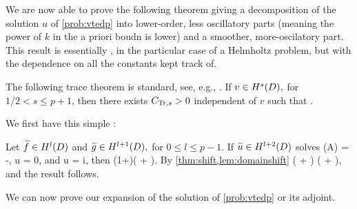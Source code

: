 We are now able to prove the following theorem giving a decomposition of the solution $u$ of \cref{prob:vtedp} into lower-order, less oscillatory parts (meaning the power of $k$ in the a priori boudn is lower) and a smoother, more-oscilatory part. This result is essentially \cite[Theorem 1]{ChNi:18a}, in the particular case of a Helmholtz problem, but with the dependence on all the constants kept track of.

The following trace theorem is standard, see, e.g., \cite[Theorem 3.37]{Mc:00}.
\label{thm:trace}
If $v \in \HsD,$ for $1/2 < s \leq p+1$, then there exists $C_{\mathrm{Tr},s} > 0$ independent of $v$ such that
\beqs
{} \leq \CTrs {}.
\eeqs
\enth

We first have this simple :

\ble\label{lem:domainshift}
Let $\ftilde \in \HlD$ and $\gtilde \in \HlpoD,$ for $0 \leq l \leq p-1$. If $\utilde \in \HlptD$ solves
\beqs
\grad \cdot \mleft(A\grad \utilde\mright) = -\ftilde,
\eeqs
\beqs \trGD u = 0,
\eeqs
and
\beqs
\dn u = i\gtilde,
\eeqs
then
\beqs
\NHlptD{\utilde} \leq \CAl\mleft(1+\CTrlpo\mright)\mleft(\NHlD{\ftilde} + \NHlpoD{\gtilde}\mright).
\eeqs
\ele
{}
By \cref{thm:shift,lem:domainshift}
\beqs
\NHlptD{\utilde} \leq \CAl \mleft(\NHlD{\ftilde} + \NHlphGI{\gtilde}\mright) \leq \CAl \mleft(\NHlD{\ftilde} + \CTrs\NHlpoD{\gtilde}\mright),
\eeqs
and the result follows.
\epf

We can now prove our expansion of the solution of \cref{prob:vtedp} or its adjoint.

